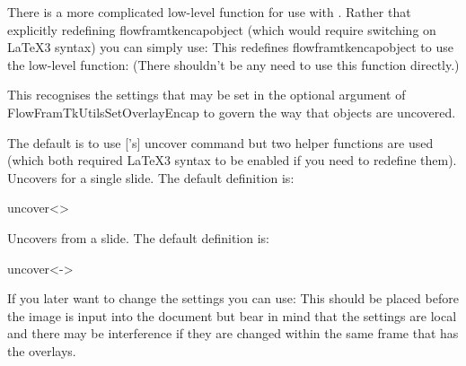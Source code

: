 \documentclass[fontsize=12pt]{scrbook}
\begin{document}
There is a more complicated low-level function for use with
. Rather that explicitly redefining
\gls{flowframtkencapobject} (which would require switching on
\LaTeX3 syntax) you can simply use:
This redefines \gls{flowframtkencapobject} to use the low-level
function:
(There shouldn't be any need to use this function directly.)

This recognises the settings that may be set in the optional argument
of \gls{FlowFramTkUtilsSetOverlayEncap} to govern the way that
objects are uncovered.

The default is to use ['s] \gls{uncover} command but two
helper functions are used (which both required \LaTeX3 syntax to be
enabled if you need to redefine them).
Uncovers for a single slide. The default definition is:
\begin{compactcodebox}
\gls{uncover}<>
\end{compactcodebox}
Uncovers from a slide. The default definition is:
\begin{compactcodebox}
\gls{uncover}<->
\end{compactcodebox}

If you later want to change the settings you can use:
This should be placed before the image is input into the document
but bear in mind that the settings are local and there may be
interference if they are changed within the same frame that has the
overlays.
\end{document}
